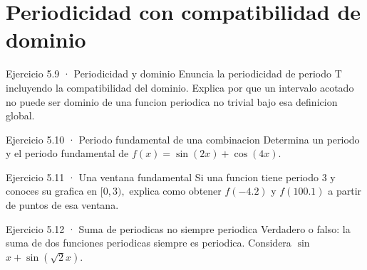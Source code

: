 \documentclass[10pt,a4paper,oneside,openany]{book}
\begin{document}
\section{Periodicidad con compatibilidad de dominio}
\begin{PSevenExerciseFixed}{Ejercicio 5.9 · Periodicidad y dominio}
Enuncia la periodicidad de periodo T incluyendo la compatibilidad del dominio. Explica por que un intervalo acotado no puede ser dominio de una funcion periodica no trivial bajo esa definicion global.
\end{PSevenExerciseFixed}
\begin{PSevenExerciseFixed}{Ejercicio 5.10 · Periodo fundamental de una combinacion}
Determina un periodo y el periodo fundamental de \(f(x)=\sin(2x)+\cos(4x)\).
\end{PSevenExerciseFixed}
\begin{PSevenExerciseFixed}{Ejercicio 5.11 · Una ventana fundamental}
Si una funcion tiene periodo \(3\) y conoces su grafica en \([0,3),\) explica como obtener \(f(-4.2)\) y \(f(100.1)\) a partir de puntos de esa ventana.
\end{PSevenExerciseFixed}
\begin{PSevenExerciseFixed}{Ejercicio 5.12 · Suma de periodicas no siempre periodica}
Verdadero o falso: la suma de dos funciones periodicas siempre es periodica. Considera \(\sin\) \(x+\sin(\sqrt{2}x)\).
\end{PSevenExerciseFixed}
\end{document}
